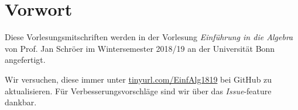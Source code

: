 \chapter*{Vorwort}
Diese Vorlesungsmitschriften werden in der Vorlesung \textit{Einführung in die Algebra} von Prof. Jan Schröer im Wintersemester 2018/19 an der Universität Bonn angefertigt.\par
Wir versuchen, diese immer unter \url{tinyurl.com/EinfAlg1819} bei GitHub zu aktualisieren. Für Verbesserungsvorschläge sind wir über das \textit{Issue}-feature dankbar.